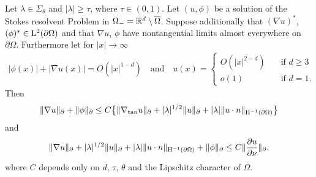 \begin{thm}
  \label{thm:rellichExterior}
  Let $\lambda \in \Sigma_\theta$ and $|\lambda| \geq \tau$, where $\tau \in (0,1)$.
  Let $(u,\phi)$ be a solution of the Stokes resolvent Problem in $\Omega_- = \mathbb{R}^d \setminus \overline\Omega$.
  Suppose additionally that $(\nabla u)^*$, $(\phi)^* \in \mathrm{L}^2(\partial\Omega)$ and that $\nabla u$, $\phi$ have nontangential limits almost everywhere on $\partial\Omega$.
  Furthermore let for $|x| \to \infty$
  \begin{align*}
    |\phi(x)| + |\nabla u(x)| = O(|x|^{1 - d}) \quad\text{and}\quad 
    u(x) = \begin{cases} O(|x|^{2 - d}) &\quad\text{if } d \geq 3 \\ o(1) &\quad\text{if } d = 1. \end{cases}
  \end{align*}
  Then
  \begin{align}
    \label{eq:rellich1ext}
    \|\nabla u\|_\partial + \|\phi\|_\partial
    \leq C \big\{ \|\nabla_{\mathrm{tan}} u\|_\partial + |\lambda|^{1/2} \|u\|_\partial + |\lambda| \|u \cdot n\|_{\mathrm{H}^{-1}(\partial\Omega)} \big\}
  \end{align}
  and
  \begin{align}
    \label{eq:rellich2ext}
    \|\nabla u\|_\partial + |\lambda|^{1/2} \|u\|_\partial + |\lambda| \|u \cdot n\|_{\mathrm{H}^{-1}(\partial\Omega)} + \|\phi\|_\partial
    \leq C \|\frac{\partial u}{\partial \nu} \|_\partial,
  \end{align}
  where $C$ depends only on $d$, $\tau$, $\theta$ and the Lipschitz character of $\Omega$.
\end{thm}
